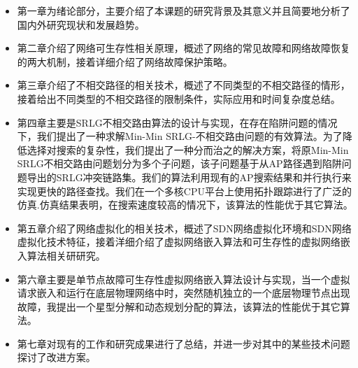 \begin{itemize}
  \item 第一章为绪论部分，主要介绍了本课题的研究背景及其意义并且简要地分析了国内外研究现状和发展趋势。
  \item 第二章介绍了网络可生存性相关原理，概述了网络的常见故障和网络故障恢复的两大机制，接着详细介绍了网络故障保护策略。
  \item 第三章介绍了不相交路径的相关技术，概述了不同类型的不相交路径的情形，接着给出不同类型的不相交路径的限制条件，实际应用和时间复杂度总结。
  \item 第四章主要是SRLG不相交路由算法的设计与实现，在存在陷阱问题的情况下，我们提出了一种求解Min-Min SRLG-不相交路由问题的有效算法。为了降低选择对搜索的复杂性，我们提出了一种分而治之的解决方案，将原Min-Min SRLG不相交路由问题划分为多个子问题，该子问题基于从AP路径遇到陷阱问题导出的SRLG冲突链路集。我们的算法利用现有的AP搜索结果和并行执行来实现更快的路径查找。我们在一个多核CPU平台上使用拓扑跟踪进行了广泛的仿真.仿真结果表明，在搜索速度较高的情况下，该算法的性能优于其它算法。
  \item 第五章介绍了网络虚拟化的相关技术，概述了SDN网络虚拟化环境和SDN网络虚拟化技术特征，接着洋细介绍了虚拟网络嵌入算法和可生存性的虚拟网络嵌入算法相关研研究。
  \item 第六章主要是单节点故障可生存性虚拟网络嵌入算法设计与实现，当一个虚拟请求嵌入和运行在底层物理网络中时，突然随机独立的一个底层物理节点出现故障，我提出一个星型分解和动态规划分配的算法，该算法的性能优于其它算法。
  \item 第七章对现有的工作和研究成果进行了总结，并进一步对其中的某些技术问题探讨了改进方案。
\end{itemize}
